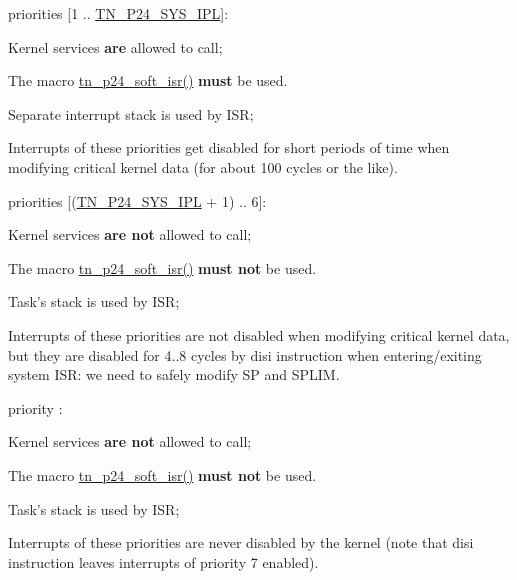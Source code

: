 \begin{DoxyItemize}
\item priorities {\ttfamily \mbox{[}1 .. \hyperlink{tn__cfg__default_8h_a4feb7eb34fc2f175167b7496b63c398a}{T\+N\+\_\+\+P24\+\_\+\+S\+Y\+S\+\_\+\+I\+P\+L}\mbox{]}}\+:
\begin{DoxyItemize}
\item Kernel services {\bfseries are} allowed to call;
\item The macro {\ttfamily \hyperlink{tn__arch__pic24_8h_a0b184d3c15066f5504144379d2624ff3}{tn\+\_\+p24\+\_\+soft\+\_\+isr()}} {\bfseries must} be used.
\item Separate interrupt stack is used by I\+S\+R;
\item Interrupts of these priorities get disabled for short periods of time when modifying critical kernel data (for about 100 cycles or the like).
\end{DoxyItemize}
\item priorities {\ttfamily \mbox{[}(\hyperlink{tn__cfg__default_8h_a4feb7eb34fc2f175167b7496b63c398a}{T\+N\+\_\+\+P24\+\_\+\+S\+Y\+S\+\_\+\+I\+P\+L} + 1) .. 6\mbox{]}}\+:
\begin{DoxyItemize}
\item Kernel services {\bfseries are not} allowed to call;
\item The macro {\ttfamily \hyperlink{tn__arch__pic24_8h_a0b184d3c15066f5504144379d2624ff3}{tn\+\_\+p24\+\_\+soft\+\_\+isr()}} {\bfseries must not} be used.
\item Task's stack is used by I\+S\+R;
\item Interrupts of these priorities are not disabled when modifying critical kernel data, but they are disabled for 4..8 cycles by {\ttfamily disi} instruction when entering/exiting system I\+S\+R\+: we need to safely modify {\ttfamily S\+P} and {\ttfamily S\+P\+L\+I\+M}.
\end{DoxyItemize}
\item priority {}\+:
\begin{DoxyItemize}
\item Kernel services {\bfseries are not} allowed to call;
\item The macro {\ttfamily \hyperlink{tn__arch__pic24_8h_a0b184d3c15066f5504144379d2624ff3}{tn\+\_\+p24\+\_\+soft\+\_\+isr()}} {\bfseries must not} be used.
\item Task's stack is used by I\+S\+R;
\item Interrupts of these priorities are never disabled by the kernel (note that {\ttfamily disi} instruction leaves interrupts of priority 7 enabled).
\end{DoxyItemize}
\end{DoxyItemize}

